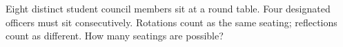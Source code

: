 Eight distinct student council members sit at a round table. Four designated officers must sit consecutively. Rotations count as the same seating; reflections count as different. How many seatings are possible?
